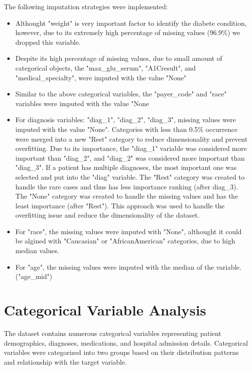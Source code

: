 The following imputation strategies were implemented:
\begin{itemize}
    \item Althought "weight" is very important factor to identify the diabete condition, however, due to its extremely high percentage of missing values (96.9\%) we dropped this variable.
    \item Despite its high percentage of missing values, due to small amount of categorical objects, the "max\_glu\_serum", "A1Cresult", and "medical\_specialty", were imputed with the value "None"
    \item Similar to the above categorical variables, the "payer\_code" and "race" variables were imputed with the value "None
    \item For diagnosis variables: "diag\_1", "diag\_2", "diag\_3", missing values were imputed with the value "None". Categories with less than 0.5\% occurrence were merged into a new "Rest" category to reduce dimensionality and prevent overfitting. 
    Due to its importance, the "diag\_1" variable was considered more important than "diag\_2", and "diag\_2" was considered more important than "diag\_3". If a patient has multiple diagnoses, the most important one was selected and put into the "diag" variable.
    The "Rest" category was created to handle the rare cases and thus has less importance ranking (after diag\_3).
    The "None" category was created to handle the missing values and has the least importance (after "Rest").
    This approach was used to handle the overfitting issue and reduce the dimensionality of the dataset.
    \item For "race", the missing values were imputed with "None", althought it could be algined with "Caucasian" or "AfricanAmerican" categories, due to high median values.
    \item For "age", the missing values were imputed with the median of the variable. ("age\_mid")
\end{itemize}
\FloatBarrier

\section{Categorical Variable Analysis}

The dataset contains numerous categorical variables representing patient demographics, diagnoses, medications, and hospital admission details. Categorical variables were categorized into two groups based on their distribution patterns and relationship with the target variable.

